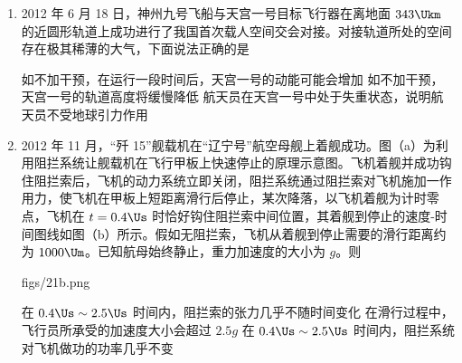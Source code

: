 \documentclass[\gkver]{gaokaozhenti}
\begin{document}
\begin{enumerate}
\item
2012 年 6 月 18 日，神州九号飞船与天宫一号目标飞行器在离地面 $343\Ukm$ 的近圆形轨道上成功进行了我国首次载人空间交会对接。对接轨道所处的空间存在极其稀薄的大气，下面说法正确的是

{如不加干预，在运行一段时间后，天宫一号的动能可能会增加}
{如不加干预，天宫一号的轨道高度将缓慢降低}
{航天员在天宫一号中处于失重状态，说明航天员不受地球引力作用}


\item
2012 年 11 月，“歼 15”舰载机在“辽宁号”航空母舰上着舰成功。图（a）为利用阻拦系统让舰载机在飞行甲板上快速停止的原理示意图。飞机着舰并成功钩住阻拦索后，飞机的动力系统立即关闭，阻拦系统通过阻拦索对飞机施加一作用力，使飞机在甲板上短距离滑行后停止，某次降落，以飞机着舰为计时零点，飞机在 $t=0.4\Us$ 时恰好钩住阻拦索中间位置，其着舰到停止的速度-时间图线如图（b）所示。假如无阻拦索，飞机从着舰到停止需要的滑行距离约为 $1000\Um$。已知航母始终静止，重力加速度的大小为 $g$。则

{figs/21b.png}

{在 $0.4\Us\sim2.5\Us$ 时间内，阻拦索的张力几乎不随时间变化}
{在滑行过程中，飞行员所承受的加速度大小会超过 $2.5g$}
{在 $0.4\Us\sim2.5\Us$ 时间内，阻拦系统对飞机做功的功率几乎不变}



\end{enumerate}
\end{document}

